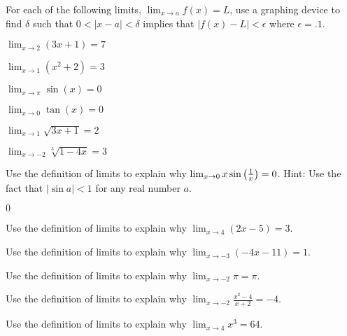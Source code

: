\begin{exercises}


\begin{exercise} 
For each of the following limits, $\lim_{x\to a} f(x) =L$, use a
graphing device to find $\delta$ such that $0<|x -a|<\delta$ implies
that $|f(x)-L|<\epsilon$ where $\epsilon = .1$.
\begin{enumerate}
\begin{multicols}{3}
\item $\lim_{x\to 2}(3x+1) = 7$  
\item $\lim_{x\to 1} (x^2+2) = 3$  
\item $\lim_{x\to \pi} \sin(x) = 0$  
\item $\lim_{x\to 0} \tan(x) = 0$
\item $\lim_{x\to 1} \sqrt{3x+1} = 2$
\item $\lim_{x\to -2} \sqrt[3]{1-4x} = 3$
\end{multicols}  
\end{enumerate}
\end{exercise}


\begin{exercise} 
Use the definition of limits to explain why $\lim _{x\to 0 } x\sin
\left( {1\over x}\right) = 0$.  Hint: Use the fact that $|\sin a |< 1
$ for any real number $a$.
\begin{answer} $0$
\end{answer}\end{exercise}

\begin{exercise} 
Use the definition of limits to explain why $\lim_{x\to 4} (2x-5)
= 3$.
\end{exercise}

\begin{exercise} 
Use the definition of limits to explain why $\lim_{x\to -3} (-4x-11)
= 1$.
\end{exercise}

\begin{exercise} 
Use the definition of limits to explain why $\lim_{x\to -2} \pi
= \pi$.
\end{exercise}


\begin{exercise} 
Use the definition of limits to explain why $\lim_{x\to -2} \frac{x^2-4}{x+2} = -4$.
\end{exercise}

\begin{exercise} 
Use the definition of limits to explain why $\lim_{x\to 4} x^3 = 64$.
\end{exercise}



\end{exercises}
